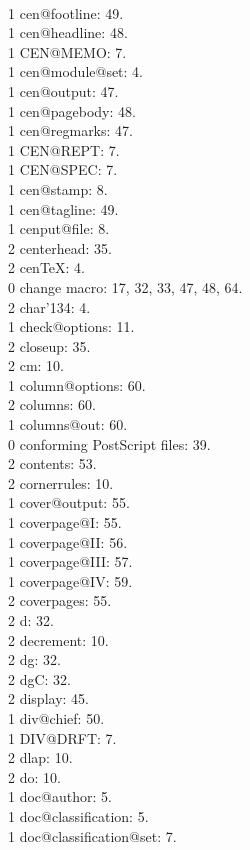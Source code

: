 \\1 cen@footline: 49.
\\1 cen@headline: 48.
\\1 CEN@MEMO: 7.
\\1 cen@module@set: 4.
\\1 cen@output: 47.
\\1 cen@pagebody: 48.
\\1 cen@regmarks: 47.
\\1 CEN@REPT: 7.
\\1 CEN@SPEC: 7.
\\1 cen@stamp: 8.
\\1 cen@tagline: 49.
\\1 cenput@file: 8.
\\2 centerhead: 35.
\\2 cenTeX: 4.
\\0 change macro: 17, 32, 33, 47, 48, 64.
\\2 char'134: 4.
\\1 check@options: 11.
\\2 closeup: 35.
\\2 cm: 10.
\\1 column@options: 60.
\\2 columns: 60.
\\1 columns@out: 60.
\\0 conforming PostScript files: 39.
\\2 contents: 53.
\\2 cornerrules: 10.
\\1 cover@output: 55.
\\1 coverpage@I: 55.
\\1 coverpage@II: 56.
\\1 coverpage@III: 57.
\\1 coverpage@IV: 59.
\\2 coverpages: 55.
\\2 d: 32.
\\2 decrement: 10.
\\2 dg: 32.
\\2 dgC: 32.
\\2 display: 45.
\\1 div@chief: 50.
\\1 DIV@DRFT: 7.
\\2 dlap: 10.
\\2 do: 10.
\\1 doc@author: 5.
\\1 doc@classification: 5.
\\1 doc@classification@set: 7.
